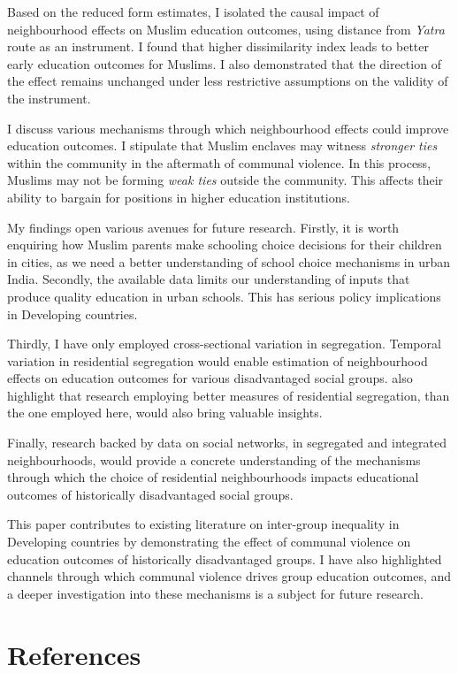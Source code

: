 \documentclass{article}
\begin{document}
Based on the reduced form estimates, I isolated the causal impact of neighbourhood effects on Muslim education outcomes, using distance from \textit{Yatra} route as an instrument. I found that higher dissimilarity index leads to better early education outcomes for Muslims. I also demonstrated that the direction of the effect remains unchanged under less restrictive assumptions on the validity of the instrument.

I discuss various mechanisms through which neighbourhood effects could improve education outcomes. I stipulate that Muslim enclaves may witness \textit{stronger ties} within the community in the aftermath of communal violence. In this process, Muslims may not be forming \textit{weak ties} outside the community. This affects their ability to bargain for positions in higher education institutions. 

My findings open various avenues for future research. Firstly, it is worth enquiring how Muslim parents make schooling choice decisions for their children in cities, as we need a better understanding of school choice mechanisms in urban India. Secondly, the available data limits our understanding of inputs that produce quality education in urban schools. This has serious policy implications in Developing countries. 

Thirdly, I have only employed cross-sectional variation in segregation. Temporal variation in residential segregation would enable estimation of neighbourhood effects on education outcomes for various disadvantaged social groups. \cite{adukia.2018} also highlight that research employing better measures of residential segregation, than the one employed here, would also bring valuable insights. 

Finally, research backed by data on social networks, in segregated and integrated neighbourhoods, would provide a concrete understanding of the mechanisms through which the choice of residential neighbourhoods impacts educational outcomes of historically disadvantaged social groups. 

This paper contributes to existing literature on inter-group inequality in Developing countries by demonstrating the effect of communal violence on education outcomes of historically disadvantaged groups. I have also highlighted channels through which communal violence drives group education outcomes, and a deeper investigation into these mechanisms is a subject for future research. 

\newpage
\section*{References}

\end{document}
